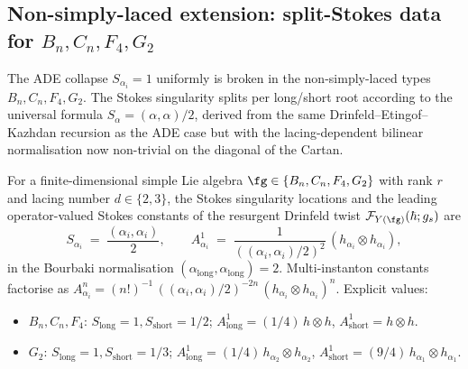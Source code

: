 \subsection{Non-simply-laced extension: split-Stokes data for
 \texorpdfstring{$B_n, C_n, F_4, G_2$}{B-n, C-n, F-4, G-2}}
\label{subsec:Yfg-resurgent-non-simply-laced}

The ADE collapse $S_{\alpha_i} = 1$ uniformly is broken in the
non-simply-laced types $B_n, C_n, F_4, G_2$. The Stokes singularity
splits per long/short root according to the universal formula
$S_\alpha = (\alpha, \alpha)/2$, derived from the same
Drinfeld--Etingof--Kazhdan recursion as the ADE case but with the
lacing-dependent bilinear normalisation now non-trivial on the
diagonal of the Cartan.

\begin{proposition}
\label{prop:Yfg-split-stokes-rational-data}
For a finite-dimensional simple Lie algebra
$\fg \in \{B_n, C_n, F_4, G_2\}$ with rank $r$ and lacing number
$d \in \{2, 3\}$, the Stokes singularity locations and the leading
operator-valued Stokes constants of the resurgent Drinfeld twist
$\mathcal{F}_{Y(\fg)}(\hbar; g_s)$ are
\[
 S_{\alpha_i} \;=\; \frac{(\alpha_i, \alpha_i)}{2},
 \qquad
 A^1_{\alpha_i}
 \;=\; \frac{1}{((\alpha_i, \alpha_i)/2)^{2}}\,
 (h_{\alpha_i} \otimes h_{\alpha_i}),
\]
in the Bourbaki normalisation $(\alpha_{\mathrm{long}},
\alpha_{\mathrm{long}}) = 2$. Multi-instanton constants factorise as
$A^n_{\alpha_i} = (n!)^{-1}\, ((\alpha_i, \alpha_i)/2)^{-2n}\,
(h_{\alpha_i} \otimes h_{\alpha_i})^n$. Explicit values:
\begin{itemize}
\item $B_n, C_n, F_4$: $S_{\mathrm{long}} = 1, S_{\mathrm{short}} = 1/2$;
 $A^1_{\mathrm{long}} = (1/4)\, h \otimes h$,
 $A^1_{\mathrm{short}} = h \otimes h$.
\item $G_2$: $S_{\mathrm{long}} = 1, S_{\mathrm{short}} = 1/3$;
 $A^1_{\mathrm{long}} = (1/4)\, h_{\alpha_2} \otimes h_{\alpha_2}$,
 $A^1_{\mathrm{short}} = (9/4)\, h_{\alpha_1} \otimes h_{\alpha_1}$.
\end{itemize}
\end{proposition}

